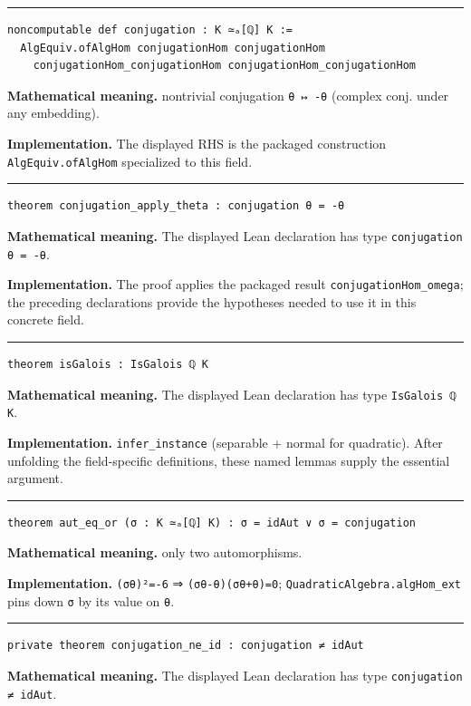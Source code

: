 \documentclass[UTF8,a4paper,11pt,fontset=fandol]{ctexart}
\theoremstyle{definition}
\newcommand{\statementsep}{\par\medskip\hrule\medskip}
\begin{document}
\statementsep
\begin{verbatim}
noncomputable def conjugation : K ≃ₐ[ℚ] K :=
  AlgEquiv.ofAlgHom conjugationHom conjugationHom
    conjugationHom_conjugationHom conjugationHom_conjugationHom
\end{verbatim}
\noindent\textbf{Mathematical meaning.} nontrivial conjugation \texttt{θ ↦ -θ} (complex conj. under any embedding).\par
\noindent\textbf{Implementation.} The displayed RHS is the packaged construction \texttt{AlgEquiv.\allowbreak{}ofAlgHom} specialized to this field.\par
\statementsep
\begin{verbatim}
theorem conjugation_apply_theta : conjugation θ = -θ
\end{verbatim}
\noindent\textbf{Mathematical meaning.} The displayed Lean declaration has type \texttt{conjugation θ = -θ}.\par
\noindent\textbf{Implementation.} The proof applies the packaged result \texttt{conjugationHom\_\allowbreak{}omega}; the preceding declarations provide the hypotheses needed to use it in this concrete field.\par
\statementsep
\begin{verbatim}
theorem isGalois : IsGalois ℚ K
\end{verbatim}
\noindent\textbf{Mathematical meaning.} The displayed Lean declaration has type \texttt{IsGalois ℚ K}.\par
\noindent\textbf{Implementation.} \texttt{infer\_\allowbreak{}instance} (separable + normal for quadratic). After unfolding the field-specific definitions, these named lemmas supply the essential argument.\par
\statementsep
\begin{verbatim}
theorem aut_eq_or (σ : K ≃ₐ[ℚ] K) : σ = idAut ∨ σ = conjugation
\end{verbatim}
\noindent\textbf{Mathematical meaning.} only two automorphisms.\par
\noindent\textbf{Implementation.} \texttt{(σθ)²=-6} ⇒ \texttt{(σθ-θ)(σθ+θ)=0}; \texttt{QuadraticAlgebra.\allowbreak{}algHom\_\allowbreak{}ext} pins down \texttt{σ} by its value on \texttt{θ}.\par
\statementsep
\begin{verbatim}
private theorem conjugation_ne_id : conjugation ≠ idAut
\end{verbatim}
\noindent\textbf{Mathematical meaning.} The displayed Lean declaration has type \texttt{conjugation ≠ idAut}.\par
\end{document}
